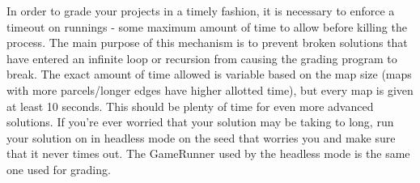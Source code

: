 \documentclass[11pt]{article}
\begin{document}
In order to grade your projects in a timely fashion, it is necessary to enforce a timeout on runnings - some maximum amount of time to allow before killing the process. The main purpose of this mechanism is to prevent broken solutions that have entered an infinite loop or recursion from causing the grading program to break. The exact amount of time allowed is variable based on the map size (maps with more parcels/longer edges have higher allotted time), but every map is given at least 10 seconds. This should be plenty of time for even more advanced solutions. If you're ever worried that your solution may be taking to long, run your solution on in headless mode on the seed that worries you and make sure that it never times out. The GameRunner used by the headless mode is the same one used for grading.
\end{document}
